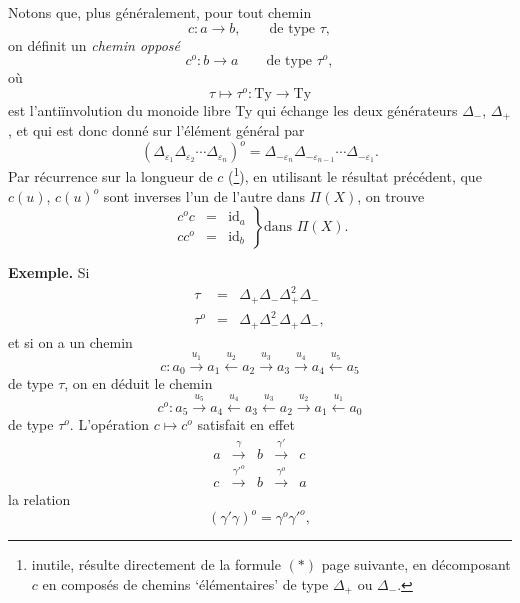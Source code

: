 \documentclass[11pt]{article}
\newcommand{\printedpage}[1]{\marginpar{\footnotesize p.~#1}}
\newcommand{\msp}[1]{\marginpar{\footnotesize [#1]}}
\begin{document}
\printedpage{43}
\msp{page 64}
Notons que, plus généralement, pour tout chemin
\[
c : a \longrightarrow b, \qquad \text{de type } \tau,
\]
on définit un \textit{chemin opposé}
\[
c^o : b \longrightarrow a \qquad \text{de type } \tau^o,
\]
où
\[
\tau \longmapsto \tau^o : \mathrm{Ty} \longrightarrow \mathrm{Ty}
\]
est l'antiïnvolution du monoide libre Ty qui échange les deux générateurs $\Delta_-$, $\Delta_+$, et qui est donc donné sur l'élément général par
\[
(\Delta_{\varepsilon_1}\Delta_{\varepsilon_2}\cdots\Delta_{\varepsilon_n})^o = \Delta_{-\varepsilon_n}\Delta_{-\varepsilon_{n-1}}\cdots\Delta_{-\varepsilon_1}.
\]
Par récurrence sur la longueur de $c$ (\footnote[18]{inutile, résulte directement de la formule $(*)$ page suivante, en décomposant $c$ en composés de chemins `élémentaires' de type $\Delta_+$ ou $\Delta_-$.}), en utilisant le résultat précédent, que $c(u)$, $c(u)^o$ sont inverses l'un de l'autre dans $\Pi(X)$, on trouve
\[
\left.
\begin{array}{rcl}
c^o c & = & \mathrm{id}_a\\
c c^o & = & \mathrm{id}_b
\end{array}
\right\}\text{dans } \Pi(X).
\]

\textbf{Exemple.} Si
\[
\begin{array}{rcl}
\tau & = & \Delta_+\Delta_-\Delta_+^2\Delta_-\\
\tau^o & = & \Delta_+\Delta_-^2\Delta_+\Delta_-,
\end{array}
\]
et si on a un chemin
\[
c : a_0 \xrightarrow{u_1} a_1 \xleftarrow{u_2} a_2 \xrightarrow{u_3} a_3 \xrightarrow{u_4} a_4 \xleftarrow{u_5} a_5
\]
de type $\tau$, on en déduit le chemin
\[
c^o : a_5 \xrightarrow{u_5} a_4 \xleftarrow{u_4} a_3 \xleftarrow{u_3} a_2 \xrightarrow{u_2} a_1 \xleftarrow{u_1} a_0
\]
de type $\tau^o$. L'opération $c \longmapsto c^o$ satisfait en
\msp{page 65}
effet
\[
\begin{array}{ccccc}
a & \xrightarrow{\gamma} & b & \xrightarrow{\gamma'} & c\\
c & \xrightarrow{\gamma'^o} & b & \xrightarrow{\gamma^o} & a
\end{array}
\]
la relation
\[
(\gamma'\gamma)^o = \gamma^o\gamma'^o, \tag*{$(*)$}
\]
\end{document}
